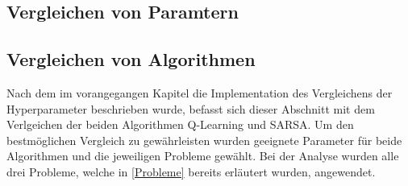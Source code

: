 \subsection{Vergleichen von Paramtern}

\subsection{Vergleichen von Algorithmen}

Nach dem im vorangegangen Kapitel die Implementation des Vergleichens der Hyperparameter beschrieben wurde, befasst sich dieser Abschnitt mit dem Verlgeichen der beiden Algorithmen Q-Learning und SARSA. 
Um den bestmöglichen Vergleich zu gewährleisten wurden geeignete Parameter für beide Algorithmen und die jeweiligen Probleme gewählt. Bei der Analyse wurden alle drei Probleme, welche in \ref{Probleme} bereits erläutert wurden, angewendet.


